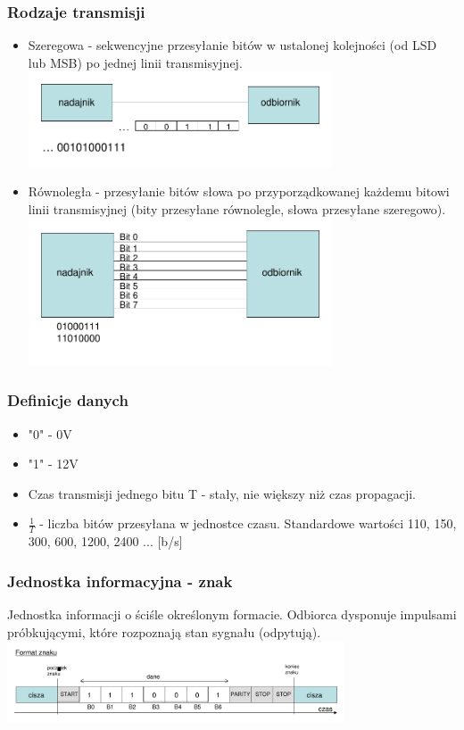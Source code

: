 \documentclass[a4paper,twoside]{article}
\begin{document}
		\subsubsection{Rodzaje transmisji}
		\begin{itemize}
			\item Szeregowa - sekwencyjne przesyłanie bitów w ustalonej kolejności (od LSD lub MSB) po jednej linii transmisyjnej.\\
			\includegraphics[width=9cm]{./wyklady/RS232_2_1.pdf}
			\item Równoległa - przesyłanie bitów słowa po przyporządkowanej każdemu bitowi linii transmisyjnej (bity przesyłane równolegle, słowa przesyłane szeregowo).\\
			\includegraphics[width=9cm]{./wyklady/RS232_2_2.pdf}
		\end{itemize}
		\subsubsection{Definicje danych}
		\begin{itemize}
			\item "0" - 0V
			\item "1" - 12V
			\item Czas transmisji jednego bitu T - stały, nie większy niż czas propagacji.
			\item $\frac{1}{T}$ - liczba bitów przesyłana w jednostce czasu. Standardowe wartości 110, 150, 300, 600, 1200, 2400 ... [b/s]
		\end{itemize}
		\subsubsection{Jednostka informacyjna - znak}
		Jednostka informacji o ściśle określonym formacie. Odbiorca dysponuje impulsami próbkującymi, które rozpoznają stan sygnału (odpytują).\\
		\includegraphics[width=10cm]{./wyklady/RS232_3_2.pdf}\\
\end{document}
